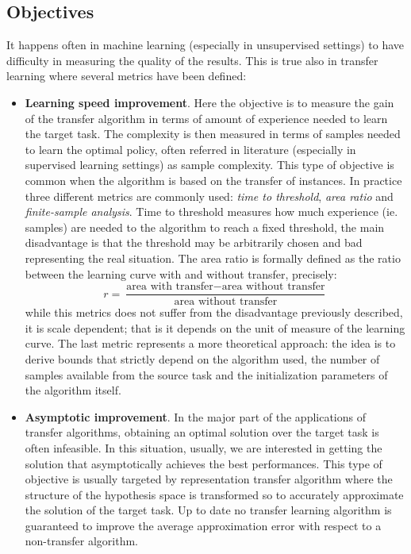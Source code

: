     \subsection{Objectives}
      \noindent It happens often in machine learning (especially in unsupervised settings) to have difficulty
      in measuring the quality of the results. This is true also in transfer learning where several metrics have been defined:
      \begin{itemize}
        \item \textbf{Learning speed improvement}. Here the objective is to measure the gain of the transfer algorithm
        in terms of amount of experience needed to learn the target task. The complexity is then measured in terms
        of samples needed to learn the optimal policy, often referred in literature (especially in supervised learning
        settings) as sample complexity. This type of objective is common when the algorithm is based on the transfer of
        instances. In practice three different metrics are commonly used: \textit{time to threshold}, \textit{area ratio}
        and \textit{finite-sample analysis}. Time to threshold measures how much experience (ie. samples) are needed to
        the algorithm to reach a fixed threshold, the main disadvantage is that the threshold may be arbitrarily chosen
        and bad representing the real situation. The area ratio is formally defined as the ratio between the learning
        curve with and without transfer, precisely:
        \begin{equation*}
          r = \frac{\text{area with transfer} - \text{area without transfer}}{\text{area without transfer}}
        \end{equation*}
        while this metrics does not suffer from the disadvantage previously described, it is scale dependent; that is
        it depends on the unit of measure of the learning curve.\newline
        The last metric represents a more theoretical approach: the idea is to derive bounds that strictly
        depend on the algorithm used, the number of samples available from the source task and the initialization
        parameters of the algorithm itself.

        \item \textbf{Asymptotic improvement}. In the major part of the applications of transfer algorithms, obtaining
        an optimal solution over the target task is often infeasible. In this situation, usually, we are interested
        in getting the solution that asymptotically achieves the best performances.
        This type of objective is usually targeted by representation transfer
        algorithm where the structure of the hypothesis space is transformed so to accurately approximate the solution
        of the target task. Up to date no transfer learning algorithm is guaranteed to improve the average approximation
        error with respect to a non-transfer algorithm.


\end{itemize}
